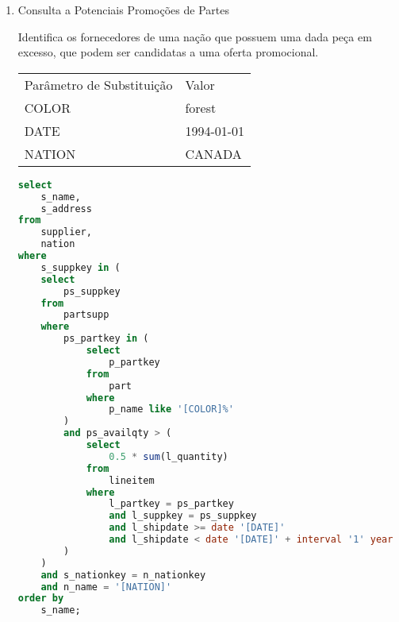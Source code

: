 \begin{enumerate}
	\begin{lstlisting}[language=SQL]
select
	sum(l_extendedprice* (1 - l_discount)) as revenue
from
	lineitem,
	part
where
	(
		p_partkey = l_partkey
		and p_brand = '[BRAND1]'
		and p_container in ('SM CASE', 'SM BOX', 'SM PACK', 'SM PKG')
		and l_quantity >= [QUANTITY1] and l_quantity <= [QUANTITY1] + 10
		and p_size between 1 and 5
		and l_shipmode in ('AIR', 'AIR REG')
		and l_shipinstruct = 'DELIVER IN PERSON'
	)
	or
	(
		p_partkey = l_partkey
		and p_brand = '[BRAND2]'
		and p_container in ('MED BAG', 'MED BOX', 'MED PKG', 'MED PACK')
		and l_quantity >= [QUANTITY2] and l_quantity <= [QUANTITY2] + 10
		and p_size between 1 and 10
		and l_shipmode in ('AIR', 'AIR REG')
		and l_shipinstruct = 'DELIVER IN PERSON'
	)
	or
	(
		p_partkey = l_partkey
		and p_brand = '[BRAND3]'
		and p_container in ('LG CASE', 'LG BOX', 'LG PACK', 'LG PKG')
		and l_quantity >= [QUANTITY3] and l_quantity <= [QUANTITY3] + 10
		and p_size between 1 and 15
		and l_shipmode in ('AIR', 'AIR REG')
		and l_shipinstruct = 'DELIVER IN PERSON'
	);
	
	\end{lstlisting}

\item[Q20 --] Consulta a Potenciais Promoções de Partes

Identifica os fornecedores de uma nação que possuem uma dada peça em excesso, que podem ser candidatas a uma oferta promocional.

\begin{tabular}{ll}
	Parâmetro de Substituição & Valor\\
	COLOR & forest\\
	DATE & 1994-01-01\\
	NATION & CANADA\\
\end{tabular}

	\begin{lstlisting}[language=SQL]
select
	s_name,
	s_address
from
	supplier,
	nation
where
	s_suppkey in (
	select
		ps_suppkey
	from
		partsupp
	where
		ps_partkey in (
			select
				p_partkey
			from
				part
			where
				p_name like '[COLOR]%'
		)
		and ps_availqty > (
			select
				0.5 * sum(l_quantity)
			from
				lineitem
			where
				l_partkey = ps_partkey
				and l_suppkey = ps_suppkey
				and l_shipdate >= date '[DATE]'
				and l_shipdate < date '[DATE]' + interval '1' year
		)
	)
	and s_nationkey = n_nationkey
	and n_name = '[NATION]'
order by
	s_name;
	

\end{lstlisting}
\end{enumerate}
